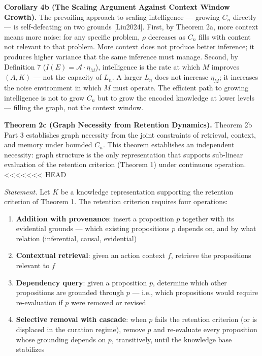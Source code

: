 \documentclass[
]{article}
\providecommand{\tightlist}{%
  \setlength{\itemsep}{0pt}\setlength{\parskip}{0pt}}
\begin{document}
\textbf{Corollary 4b (The Scaling Argument Against Context Window
Growth).} The prevailing approach to scaling intelligence --- growing
\(C_n\) directly --- is self-defeating on two grounds {[}Liu2024{]}.
First, by Theorem 2a, more context means more noise: for any specific
problem, \(\rho\) decreases as \(C_n\) fills with content not relevant
to that problem. More context does not produce better inference; it
produces higher variance that the same inference must manage. Second, by
Definition 7 (\(I(E) = \mathcal{A} \cdot
\eta_M\)), intelligence is the rate at which \(M\) improves \((A, K)\)
--- not the capacity of \(L_n\). A larger \(L_n\) does not increase
\(\eta_M\); it increases the noise environment in which \(M\) must
operate. The efficient path to growing intelligence is not to grow
\(C_n\) but to grow the encoded knowledge at lower levels --- filling
the graph, not the context window.

\textbf{Theorem 2c (Graph Necessity from Retention Dynamics).} Theorem
2b Part 3 establishes graph necessity from the joint constraints of
retrieval, context, and memory under bounded \(C_n\). This theorem
establishes an independent necessity: graph structure is the only
representation that supports sub-linear evaluation of the retention
criterion (Theorem 1) under continuous operation.
<<<<<<< HEAD

\emph{Statement.} Let \(K\) be a knowledge representation supporting the
retention criterion of Theorem 1. The retention criterion requires four
operations:

\begin{enumerate}
\def\labelenumi{(\roman{enumi})}
\tightlist
\item
  \textbf{Addition with provenance}: insert a proposition \(p\) together
  with its evidential grounds --- which existing propositions \(p\)
  depends on, and by what relation (inferential, causal, evidential)
\item
  \textbf{Contextual retrieval}: given an action context \(f\), retrieve
  the propositions relevant to \(f\)
\item
  \textbf{Dependency query}: given a proposition \(p\), determine which
  other propositions are grounded through \(p\) --- i.e., which
  propositions would require re-evaluation if \(p\) were removed or
  revised
\item
  \textbf{Selective removal with cascade}: when \(p\) fails the
  retention criterion (or is displaced in the curation regime), remove
  \(p\) and re-evaluate every proposition whose grounding depends on
  \(p\), transitively, until the knowledge base stabilizes
\end{enumerate}
\end{document}
